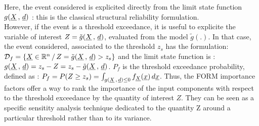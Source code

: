 {
  Here, the event considered is explicited directly from the limit state function $g({\underline{X}}\,,\,{\underline{d}})$ : this is the classical structural reliability formulation.\\
  However, if the event is a threshold exceedance, it is useful to explicite the variable of interest $Z=\tilde{g}({\underline{X}}\,,\,{\underline{d}})$, evaluated from the model $\tilde{g}(.)$. In that case, the event considered, associated to the threshold $z_s$ has the formulation: ${\mathcal D}_f = \{ {\underline{X}} \in {\mathbb R}^n \, / \, Z=\tilde{g}({\underline{X}}\,,\,{\underline{d}}) > z_s \}$
  and the limit state function is : $g({\underline{X}}\,,\,{\underline{d}}) = z_s - Z = z_s - \tilde{g}({\underline{X}}\,,\,{\underline{d}})$. $P_f$ is the threshold exceedance probability, defined as : $P_f     =       P(Z \geq z_s) = \int_{g({\underline{X}}\,,\,{\underline{d}}) \le 0}  f_{\underline{X}}(\underline{x})\, d{\underline{x}}$.
  Thus, the FORM importance factors offer a way to rank the importance of the input components with respect to the threshold exceedance by the quantity of interest $Z$. They can be seen as a specific sensitity analysis technique dedicated to the quantity Z around a particular threshold rather than to its variance.
}


